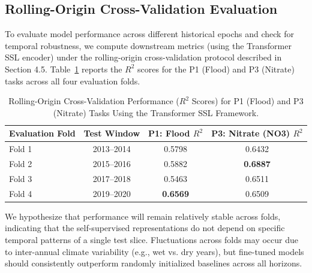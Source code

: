 \documentclass[preprint,12pt]{elsarticle}
\begin{document}
\begin{table}[H]
\centering
\caption{Block-Bootstrap Significance Test Results ($B=1{,}000$, Block Length = 12 months)}\label{tab:t_test}
\end{table}

\subsection{Rolling-Origin Cross-Validation Evaluation}
To evaluate model performance across different historical epochs and check for temporal robustness, we compute downstream metrics (using the Transformer SSL encoder) under the rolling-origin cross-validation protocol described in Section 4.5. Table~\ref{tab:rolling_origin} reports the $R^2$ scores for the P1 (Flood) and P3 (Nitrate) tasks across all four evaluation folds.

\begin{table}[H]
\centering
\caption{Rolling-Origin Cross-Validation Performance ($R^2$ Scores) for P1 (Flood) and P3 (Nitrate) Tasks Using the Transformer SSL Framework.}\label{tab:rolling_origin}
\begin{tabular}{lccc}
\toprule
Evaluation Fold & Test Window & P1: Flood $R^2$ & P3: Nitrate (NO3) $R^2$ \\
\midrule
Fold 1 & 2013--2014 & 0.5798 & 0.6432 \\
Fold 2 & 2015--2016 & 0.5882 & \textbf{0.6887} \\
Fold 3 & 2017--2018 & 0.5463 & 0.6511 \\
Fold 4 & 2019--2020 & \textbf{0.6569} & 0.6509 \\
\bottomrule
\end{tabular}
\end{table}

We hypothesize that performance will remain relatively stable across folds, indicating that the self-supervised representations do not depend on specific temporal patterns of a single test slice. Fluctuations across folds may occur due to inter-annual climate variability (e.g., wet vs. dry years), but fine-tuned models should consistently outperform randomly initialized baselines across all horizons.
\end{document}
